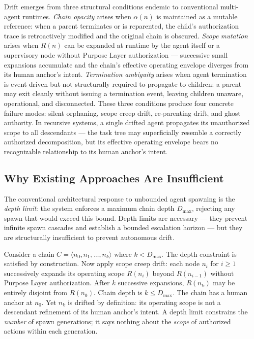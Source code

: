 Drift emerges from three structural conditions endemic to conventional multi-agent runtimes. \emph{Chain opacity} arises when $\alpha(n)$ is maintained as a mutable reference: when a parent terminates or is reparented, the child's authorization trace is retroactively modified and the original chain is obscured. \emph{Scope mutation} arises when $R(n)$ can be expanded at runtime by the agent itself or a supervisory node without Purpose Layer authorization — successive small expansions accumulate and the chain's effective operating envelope diverges from its human anchor's intent. \emph{Termination ambiguity} arises when agent termination is event-driven but not structurally required to propagate to children: a parent may exit cleanly without issuing a termination event, leaving children unaware, operational, and disconnected. These three conditions produce four concrete failure modes: silent orphaning, scope creep drift, re-parenting drift, and ghost authority. In recursive systems, a single drifted agent propagates its unauthorized scope to all descendants — the task tree may superficially resemble a correctly authorized decomposition, but its effective operating envelope bears no recognizable relationship to its human anchor's intent.

\subsection{Why Existing Approaches Are Insufficient}

The conventional architectural response to unbounded agent spawning is the \emph{depth limit}: the system enforces a maximum chain depth $D_{\max}$, rejecting any spawn that would exceed this bound. Depth limits are necessary — they prevent infinite spawn cascades and establish a bounded escalation horizon — but they are structurally insufficient to prevent autonomous drift.

Consider a chain $C = \langle n_0, n_1, \ldots, n_k \rangle$ where $k < D_{\max}$. The depth constraint is satisfied by construction. Now apply scope creep drift: each node $n_i$ for $i \geq 1$ successively expands its operating scope $R(n_i)$ beyond $R(n_{i-1})$ without Purpose Layer authorization. After $k$ successive expansions, $R(n_k)$ may be entirely disjoint from $R(n_0)$. Chain depth is $k \leq D_{\max}$. The chain has a human anchor at $n_0$. Yet $n_k$ is drifted by definition: its operating scope is not a descendant refinement of its human anchor's intent. A depth limit constrains the \emph{number} of spawn generations; it says nothing about the \emph{scope} of authorized actions within each generation.

